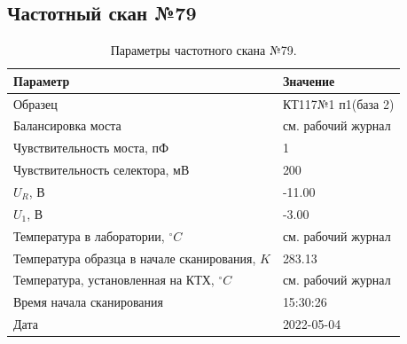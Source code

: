 \subsection{Частотный скан №79}
\begin{table}[!ht]
    \centering
    \caption{Параметры частотного скана №79.}
    \begin{tabular}{|l|l|}
        \hline
        Параметр                                       & Значение                  \\ \hline
        Образец                                        & КТ117№1 п1(база 2)        \\ \hline
        Балансировка моста                             & см. рабочий журнал        \\ \hline
        Чувствительность моста, пФ                     & 1                         \\ \hline
        Чувствительность селектора, мВ                 & 200                       \\ \hline
        $U_R$, В                                       & -11.00                    \\ \hline
        $U_1$, В                                       & -3.00                     \\ \hline
        Температура в лаборатории, $^\circ C$          & см. рабочий журнал        \\ \hline
        Температура образца в начале сканирования, $K$ & 283.13                    \\ \hline
        Температура, установленная на КТХ, $^\circ C$  & см. рабочий журнал        \\ \hline
        Время начала сканирования                      & 15:30:26                  \\ \hline
        Дата                                           & 2022-05-04                \\ \hline
    \end{tabular}
    \label{table:frequency_scan_79}
\end{table}

